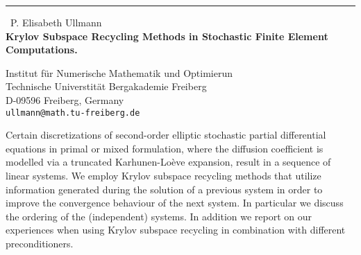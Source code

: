 \documentclass{report}
\begin{document}
\begin{center}
\rule{6in}{1pt} \
{\large P. Elisabeth Ullmann \\
{\bf Krylov Subspace Recycling Methods in Stochastic Finite Element Computations.
}}

Institut f\"{u}r Numerische Mathematik und Optimierun \\ 
Technische Universtit\"{a}t Bergakademie Freiberg \\
D-09596 Freiberg, Germany \\
{\tt ullmann@math.tu-freiberg.de}\\
\end{center}

Certain discretizations of second-order elliptic stochastic partial differential equations in primal or mixed formulation, where the diffusion coefficient is modelled via a truncated Karhunen-Lo\`{e}ve expansion, result in a sequence of linear systems. We employ Krylov subspace recycling methods that utilize information generated during the solution of a previous system in order to improve the convergence behaviour of the next system. In particular we discuss the ordering of the (independent) systems. In addition we report on our experiences when using Krylov subspace recycling in combination with different preconditioners.
\end{document}
